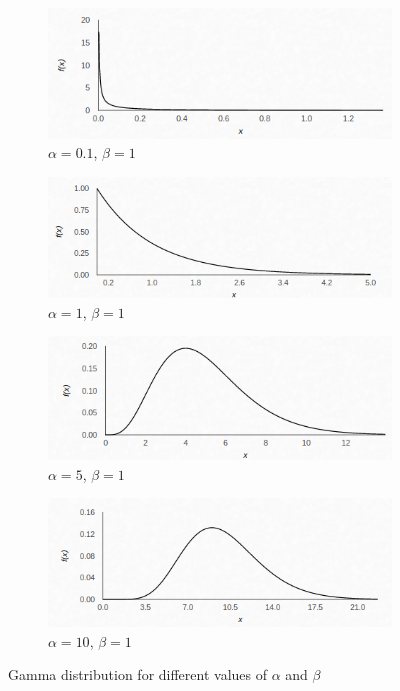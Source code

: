 \documentclass[a4paper,12pt]{article} %
\begin{document}
\begin{figure}[H]
	
	\begin{subfigure}{.4\textwidth}
		\centering
		\includegraphics[width=.8\linewidth]{Gamma/Gamma_alp01_bet1.png}
		\caption{$\alpha = 0.1 $, $\beta = 1 $}
	\end{subfigure}%
	\begin{subfigure}{.4\textwidth}
		\centering
		\includegraphics[width=.8\linewidth]{Gamma/Gamma_alp1_bet1.png}
		\caption{$\alpha = 1 $, $\beta = 1 $}
	\end{subfigure}%
	
		\begin{subfigure}{.4\textwidth}
		\centering
		\includegraphics[width=.8\linewidth]{Gamma/Gamma_alp5_bet1.png}
		\caption{$\alpha = 5 $, $\beta = 1 $}
	\end{subfigure}%
	\begin{subfigure}{.4\textwidth}
		\centering
		\includegraphics[width=.8\linewidth]{Gamma/Gamma_alp10_bet1.png}
		\caption{$\alpha = 10 $, $\beta = 1 $}
	\end{subfigure}%
	\caption{Gamma distribution for different values of $\alpha$ and $\beta$}
	\label{fig:Gammas}
\end{figure}   
\end{document}
